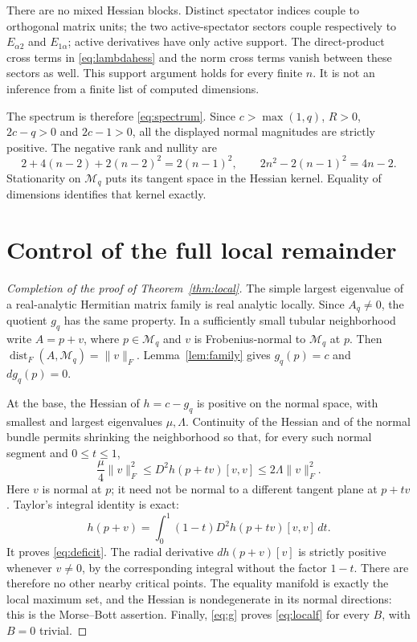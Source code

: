 \documentclass[11pt,a4paper]{article}
\newcommand{\dist}{\operatorname{dist}_F}
\newcommand{\norm}[1]{\lVert #1\rVert_F}
\newcommand{\Mq}{\mathcal M_q}
\begin{document}
There are no mixed Hessian blocks. Distinct spectator indices
couple to orthogonal matrix units; the two active-spectator
sectors couple respectively to \(E_{\alpha2}\) and
\(E_{1\alpha}\); active derivatives have only active support.
The direct-product cross terms in \eqref{eq:lambdahess} and
the norm cross terms vanish between these sectors as well.
This support argument holds for every finite \(n\).
It is not an inference from a finite list of computed dimensions.

The spectrum is therefore \eqref{eq:spectrum}. Since
\(c>\max(1,q)\), \(R>0\), \(2c-q>0\) and \(2c-1>0\),
all the displayed normal magnitudes are strictly positive.
The negative rank and nullity are
\begin{equation}
 2+4(n-2)+2(n-2)^2=2(n-1)^2,\qquad
 2n^2-2(n-1)^2=4n-2.
\end{equation}
Stationarity on \(\Mq\) puts its tangent space in the
Hessian kernel. Equality of dimensions identifies that
kernel exactly.

\section{Control of the full local remainder}
\begin{proof}[Completion of the proof of Theorem~\ref{thm:local}]
The simple largest eigenvalue of a real-analytic Hermitian
matrix family is real analytic locally. Since \(A_q\neq0\),
the quotient \(g_q\) has the same property.
In a sufficiently small tubular neighborhood write
\(A=p+v\), where \(p\in\Mq\) and \(v\) is
Frobenius-normal to \(\Mq\) at \(p\).
Then \(\dist(A,\Mq)=\norm{v}\).
Lemma~\ref{lem:family} gives
\(g_q(p)=c\) and \(dg_q(p)=0\).

At the base, the Hessian of \(h=c-g_q\) is positive
on the normal space, with smallest and largest eigenvalues
\(\mu,\Lambda\). Continuity of the Hessian and of the
normal bundle permits shrinking the neighborhood so that,
for every such normal segment and \(0\leq t\leq1\),
\begin{equation}
 \frac{\mu}{4}\norm{v}^2
 \leq D^2h(p+tv)[v,v]\leq
 2\Lambda\norm{v}^2.
 \label{eq:continuity}
\end{equation}
Here \(v\) is normal at \(p\); it need not be normal
to a different tangent plane at \(p+tv\).
Taylor's integral identity is exact:
\begin{equation}
 h(p+v)=\int_0^1(1-t)D^2h(p+tv)[v,v]\,dt.
\end{equation}
It proves \eqref{eq:deficit}. The radial derivative
\(dh(p+v)[v]\) is strictly positive whenever \(v\neq0\),
by the corresponding integral without the factor \(1-t\).
There are therefore no other nearby critical points.
The equality manifold is exactly the local maximum set,
and the Hessian is nondegenerate in its normal directions:
this is the Morse--Bott assertion.
Finally, \eqref{eq:g} proves \eqref{eq:localf}
for every \(B\), with \(B=0\) trivial.
\end{proof}
\end{document}
